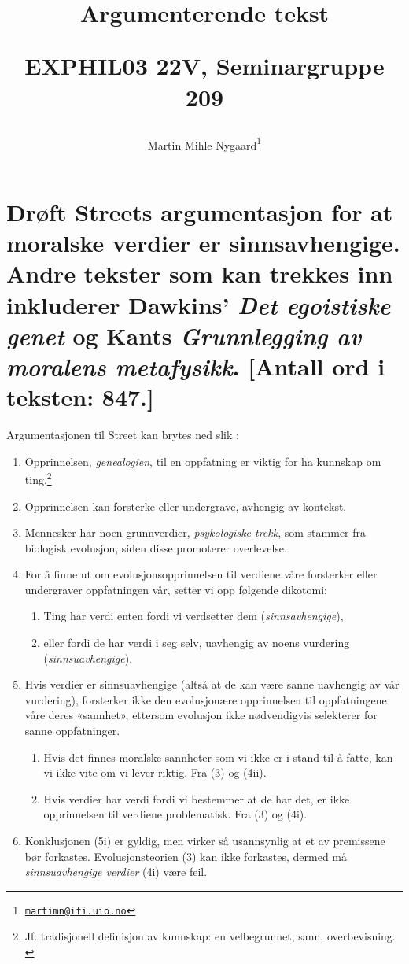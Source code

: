 \documentclass[a4paper,norsk]{article}
\title{Argumenterende tekst \par {\large EXPHIL03 22V, Seminargruppe 209\par}}
\author{Martin Mihle Nygaard\footnote{\href{mailto:martimn@ifi.uio.no}{\nolinkurl{martimn@ifi.uio.no}}}}
\date{}
\begin{document}
\maketitle

\section*{\normalsize\sf%
  Drøft Streets argumentasjon for at moralske verdier er sinnsavhengige. Andre
  tekster som kan trekkes inn inkluderer Dawkins' \emph{Det egoistiske genet}
  og Kants \emph{Grunnlegging av moralens metafysikk}. [Antall ord i teksten: 847.]
}

Argumentasjonen til Street kan brytes ned slik \autocite{street}:

\begin{enumerate}
\def\labelenumi{(\arabic{enumi})}
\item
  Opprinnelsen, \emph{genealogien}, til en oppfatning er viktig for ha kunnskap
  om ting.\footnote{Jf. tradisjonell definisjon av kunnskap: en velbegrunnet,
  sann, overbevisning. \autocite[87]{wikforss}}
\item
  Opprinnelsen kan forsterke eller undergrave, avhengig av kontekst.
\item
  Mennesker har noen grunnverdier, \emph{psykologiske trekk}, som
  stammer fra biologisk evolusjon, siden disse promoterer overlevelse.
\item
  For å finne ut om evolusjonsopprinnelsen til verdiene våre forsterker
  eller undergraver oppfatningen vår, setter vi opp følgende dikotomi:

  \begin{enumerate}
  \def\labelenumii{(\roman{enumii})}
  \item
    Ting har verdi enten fordi vi verdsetter dem
    (\emph{sinnsavhengige}),
  \item
    eller fordi de har verdi i seg selv, uavhengig av noens vurdering
    (\emph{sinnsuavhengige}).
  \end{enumerate}
\item
  Hvis verdier er sinnsuavhengige (altså at de kan være sanne uavhengig
  av vår vurdering), forsterker ikke den evolusjonære opprinnelsen til
  oppfatningene våre deres «sannhet», ettersom evolusjon ikke
  nødvendigvis selekterer for sanne oppfatninger.

  \begin{enumerate}
  \def\labelenumii{(\roman{enumii})}
  \item
    Hvis det finnes moralske sannheter som vi ikke er i stand til å
    fatte, kan vi ikke vite om vi lever riktig. Fra (3) og (4ii).
  \item
    Hvis verdier har verdi fordi vi bestemmer at de har det, er ikke
    opprinnelsen til verdiene problematisk. Fra (3) og (4i).
  \end{enumerate}
\item
  Konklusjonen (5i) er gyldig, men virker så usannsynlig at et av
  premissene bør forkastes. Evolusjonsteorien (3) kan ikke forkastes,
  dermed må \emph{sinnsuavhengige verdier} (4i) være feil.
\end{enumerate}
\end{document}
